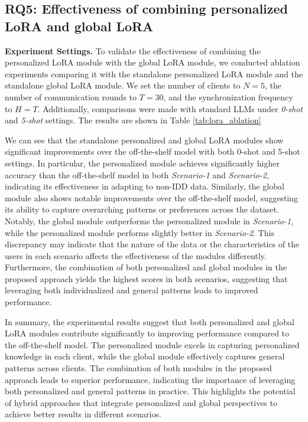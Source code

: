 \documentclass[sigconf]{acmart}
\begin{document}
\subsection{RQ5: Effectiveness of combining personalized LoRA and global LoRA}
\textbf{Experiment Settings.}  To validate the effectiveness of combining the personalized LoRA module with the global LoRA module, we conducted ablation experiments comparing it with the standalone personalized LoRA module and the standalone global LoRA module. We set the number of clients to $N=5$, the number of communication rounds to $T=30$, and the synchronization frequency to $H=T$. Additionally, comparisons were made with standard LLMs under \textit{0-shot} and \textit{5-shot} settings. The results are shown in Table \ref{tab:lora_ablation}
\par
We can see that the standalone personalized and global LoRA modules show significant improvements over the off-the-shelf model with both 0-shot and 5-shot settings. In particular, the personalized module achieves significantly higher accuracy than the off-the-shelf model in both \textit{Scenario-1} and \textit{Scenario-2}, indicating its effectiveness in adapting to non-IDD data. Similarly, the global module also shows notable improvements over the off-the-shelf model, suggesting its ability to capture overarching patterns or preferences across the dataset. Notably, the global module outperforms the personalized module in \textit{Scenario-1}, while the personalized module performs slightly better in \textit{Scenario-2}. This discrepancy may indicate that the nature of the data or the characteristics of the users in each scenario affects the effectiveness of the modules differently. Furthermore, the combination of both personalized and global modules in the proposed approach yields the highest scores in both scenarios, suggesting that leveraging both individualized and general patterns leads to improved performance.
\par
In summary, the experimental results suggest that both personalized and global LoRA modules contribute significantly to improving performance compared to the off-the-shelf model. The personalized module excels in capturing personalized knowledge in each client, while the global module effectively captures general patterns across clients. The combination of both modules in the proposed approach leads to superior performance, indicating the importance of leveraging both personalized and general patterns in practice. This highlights the potential of hybrid approaches that integrate personalized and global perspectives to achieve better results in different scenarios.
\end{document}
